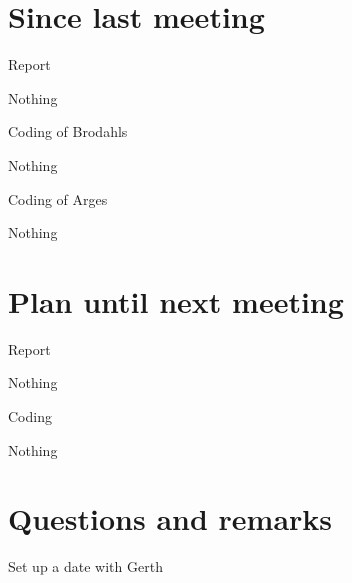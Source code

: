 \documentclass[a4paper,11pt,agenda,chair]{meetingmins}
\begin{document}
\maketitle

\section{Since last meeting}
\begin{items}
\item Report
	\begin{items}
		\item Nothing
	\end{items}
\item Coding of Brodahls
	\begin{items}
		\item Nothing
	\end{items}
\item Coding of Arges
	\begin{items}
		\item Nothing
	\end{items}
\end{items}

\section{Plan until next meeting}
\begin{items}
\item Report
	\begin{items}
		\item Nothing
	\end{items}
\item Coding
	\begin{items}
		\item Nothing
	\end{items}
\end{items}

\section{Questions and remarks}
\begin{items}
	\item Set up a date with Gerth
	
\end{items}
\end{document}
